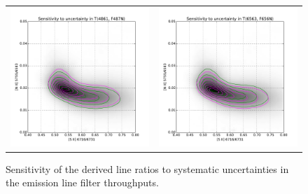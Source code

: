 \documentclass[preprint]{aastex}
\begin{document}
\begin{figure}[p]
\begin{tabular}{ll}
    \includegraphics{ratio-sensitivity-T4861-F487N} &
    \includegraphics{ratio-sensitivity-T6563-F656N} \\
  \end{tabular}
  \caption{Sensitivity of the derived line ratios to systematic
    uncertainties in the emission line filter throughputs.}
  \label{fig:sens-T}
\end{figure}
\end{document}
